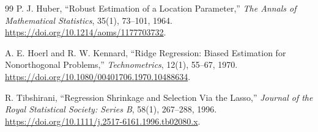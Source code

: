 \documentclass[11pt,a4paper]{ltjsarticle}
\begin{document}
\begin{thebibliography}{99}
P. J. Huber, ``Robust Estimation of a Location Parameter,''
\textit{The Annals of Mathematical Statistics}, 35(1), 73--101, 1964.
\url{https://doi.org/10.1214/aoms/1177703732}.

A. E. Hoerl and R. W. Kennard, ``Ridge Regression: Biased Estimation for Nonorthogonal Problems,''
\textit{Technometrics}, 12(1), 55--67, 1970.
\url{https://doi.org/10.1080/00401706.1970.10488634}.

R. Tibshirani, ``Regression Shrinkage and Selection Via the Lasso,''
\textit{Journal of the Royal Statistical Society: Series B}, 58(1), 267--288, 1996.
\url{https://doi.org/10.1111/j.2517-6161.1996.tb02080.x}.
\end{thebibliography}
\endgroup
\end{document}
